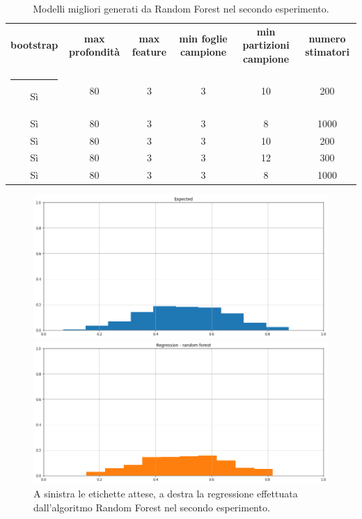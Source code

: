 \documentclass[12pt]{report}
\makeatletter
\theoremstyle{definition}
\newcommand{\thickhline}{%
    \noalign {\ifnum 0=`}\fi \hrule height 1pt
    \futurelet \reserved@a \@xhline
}
\makeatother
\begin{document}
\begin{table}
\centering
\begin{adjustbox}{max width=\textwidth}
 \begin{tabular}{|c|c|c|c|c|c|} 
 \hline
\textbf{bootstrap} & \textbf{max profondità} & \textbf{max feature} & \textbf{min foglie campione} & \textbf{min partizioni campione} & \textbf{numero stimatori}
\\ [0.5ex] 
 \thickhline
 Sì & 80 & 3 & 3 & 10 & 200 \\ 
 Sì & 80 & 3 & 3 & 8 & 1000 \\ 
 Sì & 80 & 3 & 3 & 10 & 200 \\ 
 Sì & 80 & 3 & 3 & 12 & 300 \\ 
 Sì & 80 & 3 & 3 & 8 & 1000 \\ 
 \hline
\end{tabular}
\end{adjustbox}
\caption{Modelli migliori generati da Random Forest nel secondo esperimento.}
\label{models_rf_exp2}
\end{table}

\begin{figure}
\centering
    \begin{minipage}{0.48\textwidth}
        \includegraphics[width=\linewidth]{images/experiment_beta5_disgiunti/expected_memberships.png}
    \end{minipage}
    \begin{minipage}{0.48\textwidth}
        \includegraphics[width=\linewidth]{images/experiment_beta5_disgiunti/prediction_regression_rf.png}
    \end{minipage}
    \caption{A sinistra le etichette attese, a destra la regressione effettuata dall'algoritmo Random Forest nel secondo esperimento.}
    \label{rf_exp2}
\end{figure} 
\end{document}

